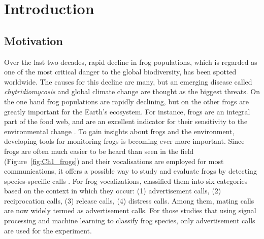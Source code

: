 
\chapter[Introduction]{Introduction}
\label{cha:cha1Introduction}
\section{Motivation}
Over the last two decades, rapid decline in frog populations, which is regarded as one of the most critical danger to the global biodiversity, has been spotted worldwide. The causes for this decline are many, but an emerging disease called \textit{chytridiomycosis} \citep{mutschmann2015chytridiomycosis} and global climate change \citep{carey2003climate} are thought as the biggest threats. On the one hand frog populations are rapidly declining, but on the other frogs are greatly important for the Earth's ecosystem. For instance, frogs are an integral part of the food web, and are an excellent indicator for their sensitivity to the environmental change \citep{boll2013amphibians}. To gain insights about frogs and the environment, developing tools for monitoring frogs is becoming ever more important. Since frogs are often much easier to be heard than seen in the field (Figure~\ref{fig:Ch1_frogs}) and their vocalisations are employed for most communications, it offers a possible way to study and evaluate frogs by detecting species-specific calls \citep{dorcas2009auditory}. For frog vocalizations, \cite{duellman1994biology} classified them into six categories based on the context in which they occur: (1) advertisement calls, (2) reciprocation calls, (3) release calls, (4) distress calls. Among them, mating calls are now widely termed as advertisement calls. For those studies that using signal processing and machine learning to classify frog species, only advertisement calls are used for the experiment.





